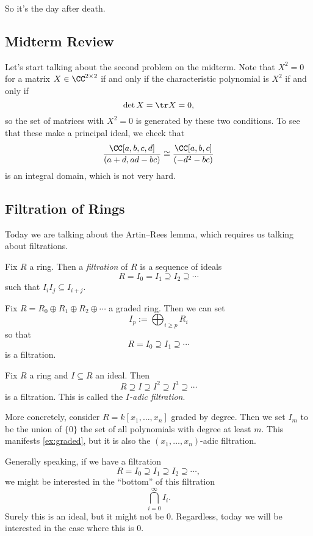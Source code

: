 
So it's the day after death.

\subsection{Midterm Review}
Let's start talking about the second problem on the midterm. Note that $X^2=0$ for a matrix $X\in\CC^{2\times2}$ if and only if the characteristic polynomial is $X^2$ if and only if
\[\det X=\tr X=0,\]
so the set of matrices with $X^2=0$ is generated by these two conditions. To see that these make a principal ideal, we check that
\[\frac{\CC[a,b,c,d]}{(a+d,ad-bc)}\cong\frac{\CC[a,b,c]}{(-d^2-bc)}\]
is an integral domain, which is not very hard.

\subsection{Filtration of Rings}
Today we are talking about the Artin--Rees lemma, which requires us talking about filtrations.
\begin{definition}
	Fix $R$ a ring. Then a \textit{filtration} of $R$ is a sequence of ideals
	\[R=I_0= I_1\supseteq I_2\supseteq\cdots\]
	such that $I_iI_j\subseteq I_{i+j}$.
\end{definition}
\begin{example} \label{ex:graded}
	Fix $R=R_0\oplus R_1\oplus R_2\oplus\cdots$ a graded ring. Then we can set
	\[I_p:=\bigoplus_{i\ge p}R_i\]
	so that
	\[R=I_0\supseteq I_1\supseteq\cdots\]
	is a filtration.
\end{example}
\begin{defi}
	Fix $R$ a ring and $I\subseteq R$ an ideal. Then
	\[R\supseteq I\supseteq I^2\supseteq I^3\supseteq\cdots\]
	is a filtration. This is called the \textit{$I$-adic filtration}.
\end{defi}
\begin{example}
	More concretely, consider $R=k[x_1,\ldots,x_n]$ graded by degree. Then we set $I_m$ to be the union of $\{0\}$ the set of all polynomials with degree at least $m$. This manifests \autoref{ex:graded}, but it is also the $(x_1,\ldots,x_n)$-adic filtration.
\end{example}
Generally speaking, if we have a filtration
\[R=I_0\supseteq I_1\supseteq I_2\supseteq\cdots,\]
we might be interested in the ``bottom'' of this filtration
\[\bigcap_{i=0}^\infty I_i.\]
Surely this is an ideal, but it might not be $0$. Regardless, today we will be interested in the case where this is $0$.

